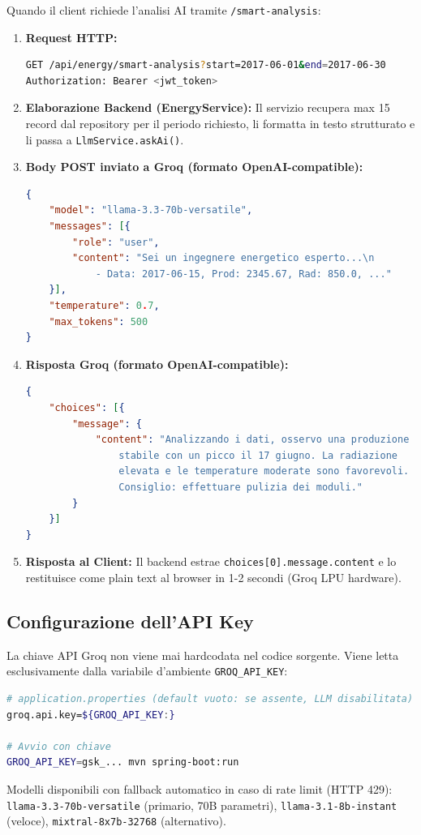 \documentclass[a4paper,12pt]{report}
\begin{document}
Quando il client richiede l'analisi AI tramite \texttt{/smart-analysis}:

\begin{enumerate}
    \item \textbf{Request HTTP:}
    \begin{lstlisting}[language=bash]
GET /api/energy/smart-analysis?start=2017-06-01&end=2017-06-30
Authorization: Bearer <jwt_token>
    \end{lstlisting}

    \item \textbf{Elaborazione Backend (EnergyService):} Il servizio recupera max 15 record dal repository per il periodo richiesto, li formatta in testo strutturato e li passa a \texttt{LlmService.askAi()}.

    \item \textbf{Body POST inviato a Groq (formato OpenAI-compatible):}
    \begin{lstlisting}[language=json, caption=Body POST a Groq API]
{
    "model": "llama-3.3-70b-versatile",
    "messages": [{
        "role": "user",
        "content": "Sei un ingegnere energetico esperto...\n
            - Data: 2017-06-15, Prod: 2345.67, Rad: 850.0, ..."
    }],
    "temperature": 0.7,
    "max_tokens": 500
}
    \end{lstlisting}

    \item \textbf{Risposta Groq (formato OpenAI-compatible):}
    \begin{lstlisting}[language=json, caption=Risposta da Groq API]
{
    "choices": [{
        "message": {
            "content": "Analizzando i dati, osservo una produzione
                stabile con un picco il 17 giugno. La radiazione
                elevata e le temperature moderate sono favorevoli.
                Consiglio: effettuare pulizia dei moduli."
        }
    }]
}
    \end{lstlisting}

    \item \textbf{Risposta al Client:} Il backend estrae \texttt{choices[0].message.content} e lo restituisce come plain text al browser in 1-2 secondi (Groq LPU hardware).
\end{enumerate}

\subsection{Configurazione dell'API Key}
La chiave API Groq non viene mai hardcodata nel codice sorgente. Viene letta esclusivamente dalla variabile d'ambiente \texttt{GROQ\_API\_KEY}:
\begin{lstlisting}[language=bash, caption=Configurazione sicura tramite variabile d'ambiente]
# application.properties (default vuoto: se assente, LLM disabilitata)
groq.api.key=${GROQ_API_KEY:}

# Avvio con chiave
GROQ_API_KEY=gsk_... mvn spring-boot:run
\end{lstlisting}
Modelli disponibili con fallback automatico in caso di rate limit (HTTP 429): \texttt{llama-3.3-70b-versatile} (primario, 70B parametri), \texttt{llama-3.1-8b-instant} (veloce), \texttt{mixtral-8x7b-32768} (alternativo).
\end{document}
